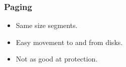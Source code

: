 \documentclass[8pt]{extarticle}
\begin{document}
\begin{multicols}{3}
\subsubsection{Paging}
\begin{itemize}
  \item Same size segments.
  \item Easy movement to and from disks.
  \item Not as good at protection.
\end{itemize}

\end{multicols}
\end{document}

